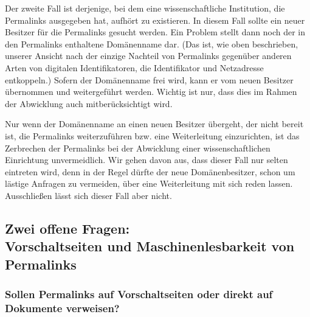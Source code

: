 \documentclass[12pt, a4paper]{article}
\begin{document}
Der zweite Fall ist derjenige, bei dem eine wissenschaftliche
Institution, die Permalinks ausgegeben hat, aufhört zu existieren. In
diesem Fall sollte ein neuer Besitzer für die Permalinks gesucht
werden. Ein Problem stellt dann noch der in den Permalinks enthaltene
Domänenname dar. (Das ist, wie oben beschrieben, unserer Ansicht nach
der einzige Nachteil von Permalinks gegenüber anderen Arten von
digitalen Identifikatoren, die Identifikator und Netzadresse
entkoppeln.) Sofern der Domänenname frei wird, kann er vom neuen
Besitzer übernommen und weitergeführt werden. Wichtig ist nur, dass
dies im Rahmen der Abwicklung auch mitberücksichtigt wird.

Nur wenn der Domänenname an einen neuen Besitzer übergeht, der nicht
bereit ist, die Permalinks weiterzuführen bzw. eine Weiterleitung
einzurichten, ist das Zerbrechen der Permalinks bei der Abwicklung
einer wissenschaftlichen Einrichtung unvermeidlich. Wir gehen davon
aus, dass dieser Fall nur selten eintreten wird, denn in der Regel
dürfte der neue Domänenbesitzer, schon um lästige Anfragen zu
vermeiden, über eine Weiterleitung mit sich reden lassen. Ausschließen
lässt sich dieser Fall aber nicht.

\subsection{\texorpdfstring{Zwei offene Fragen:\\
Vorschaltseiten und Maschinenlesbarkeit von Permalinks}{Zwei
    offene Fragen: Vorschaltseiten und Maschinenlesbarkeit von
    Permalinks}}
\label{zwei-offene-fragen-vorschaltseiten-und-maschinenlesbarkeit-von-permalinks}

\subsubsection{Sollen Permalinks auf Vorschaltseiten oder direkt
  auf Dokumente verweisen?}
\label{sollen-permalinks-auf-vorschaltseiten-oder-direkt-auf-dokumente-verweisen}
\end{document}
